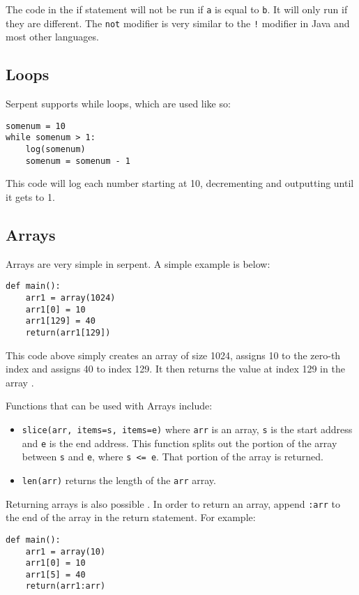 \documentclass[12pt]{article}
\begin{document}
The code in the if statement will not be run if \texttt{a} is equal to \texttt{b}. It will only run if they are different. The \texttt{not} modifier is very similar to the \texttt{!} modifier in Java and most other languages. \cite{Serpent}
	
\subsection{Loops}
Serpent supports while loops, which are used like so:
\begin{verbatim}
somenum = 10
while somenum > 1:
	log(somenum)
	somenum = somenum - 1
\end{verbatim}

This code will log each number starting at 10, decrementing and outputting until it gets to 1. \cite{Serpent1.0(old)}

\subsection{Arrays}
Arrays are very simple in serpent. A simple example is below:
\begin{verbatim}
def main():
	arr1 = array(1024)
	arr1[0] = 10
	arr1[129] = 40
	return(arr1[129])
\end{verbatim}

This code above simply creates an array of size 1024, assigns 10 to the zero-th index and assigns 40 to index 129. It then returns the value at index 129 in the array \cite{Serpent,Serpent1.0(old)}. 

Functions that can be used with Arrays include:
\begin{itemize}
	\item \texttt{slice(arr, items=s, items=e)} where \texttt{arr} is an array, \texttt{s} is the start address and \texttt{e} is the end address. This function splits out the portion of the array between \texttt{s} and \texttt{e}, where \texttt{s <= e}. That portion of the array is returned.
	\item \texttt{len(arr)} returns the length of the \texttt{arr} array.
\end{itemize}

Returning arrays is also possible \cite{Serpent}. In order to return an array, append \texttt{:arr} to the end of the array in the return statement. For example:

\begin{verbatim}
def main():
	arr1 = array(10)
	arr1[0] = 10
	arr1[5] = 40
	return(arr1:arr)
\end{verbatim}
\end{document}
